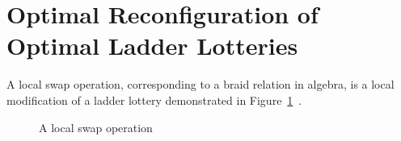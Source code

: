 
\section{Optimal Reconfiguration of Optimal Ladder Lotteries}
A local swap operation, corresponding to a braid relation in algebra, is a local modification of a ladder lottery 
demonstrated in Figure~\ref{Fig:LocalSwap}~\cite{A1}.
\begin{figure}[h]
    \centering 
    \caption{A local swap operation}
    \label{Fig:LocalSwap}
\end{figure}

